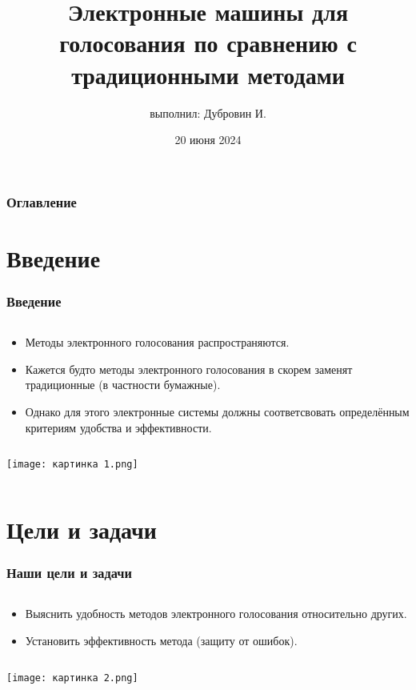 \documentclass[11pt]{beamer}
\date{20 июня 2024}
\title{Электронные машины для голосования по сравнению с традиционными методами}
\author{выполнил: Дубровин И.}
\begin{document}
\frame{\titlepage}

\begin{frame}
\frametitle{Оглавление}
\tableofcontents
\end{frame}

\section{Введение}

\begin{frame}
\frametitle{Введение}
    \begin{column}[h]{0.6\linewidth}  
        \begin{itemize}
        \item Методы электронного голосования распространяются.
        \item Кажется будто методы электронного голосования в скорем \alert{заменят} традиционные (в частности бумажные).
        \item Однако для этого электронные системы должны соответсвовать определённым критериям \alert{удобства} и \alert{эффективности}.
        \end{itemize}
    \end{column}
    \hfill
    \begin{column}[h]{0.35\linewidth}
        \centering
        \texttt{[image: картинка 1.png]}
    \end{column}
\end{frame}

\section{Цели и задачи}

\begin{frame}
\frametitle{Наши цели и задачи}
    \begin{column}[h]{0.6\linewidth}  
        \begin{itemize}
        \item Выяснить удобность методов электронного голосования относительно других. \newline
        
        \item Установить эффективность метода (защиту от ошибок).
        \end{itemize}
    \end{column}
    \begin{column}[h]{0.4\linewidth}
        \centering
        \texttt{[image: картинка 2.png]}
    \end{column}
\end{frame}
\end{document}
